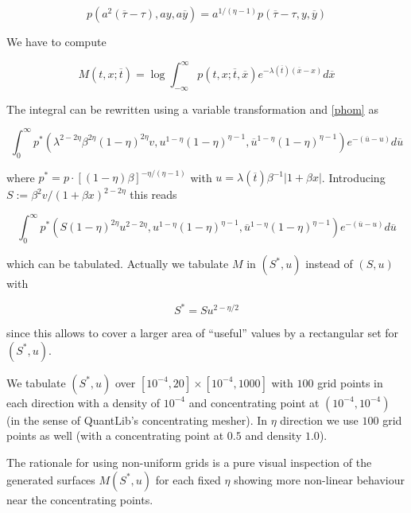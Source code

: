 \documentclass{amsart}
\theoremstyle{plain}
\numberwithin{equation}{section}
\begin{document}
\begin{equation}\label{phom}
p\left(a^2(\overline{\tau}-\tau), ay, a\overline{y}\right) = a^{1/(\eta-1)} p\left(\overline{\tau}-\tau, y, \overline{y}\right)
\end{equation}

We have to compute

\begin{equation}
M(t,x;\overline{t}) = \log \int_{-\infty}^{\infty} p(t,x;\overline{t},\overline{x}) e^{-\lambda(\overline{t})(\overline{x}-x)}d\overline{x}
\end{equation}

The integral can be rewritten using a variable transformation and \ref{phom} as

\begin{equation}
\int_{0}^{\infty} p^* ( \lambda^{2-2\eta} \beta^{2\eta} (1-\eta)^{2\eta} v, u^{1-\eta}(1-\eta)^{\eta-1}, \overline{u}^{1-\eta}(1-\eta)^{\eta-1} ) e^{-(\overline{u}-u)} d\overline{u}
\end{equation}

where $p^*= p\cdot [(1-\eta)\beta]^{-\eta/(\eta-1)}$ with $u = \lambda(\overline{t})\beta^{-1}|1+\beta x|$. Introducing $S:=\beta^2v/(1+\beta x)^{2-2\eta}$ this reads

\begin{equation}
\int_{0}^{\infty} p^* ( S (1-\eta)^{2\eta} u^{2-2\eta}, u^{1-\eta}(1-\eta)^{\eta-1}, \overline{u}^{1-\eta}(1-\eta)^{\eta-1} ) e^{-(\overline{u}-u)} d\overline{u}
\end{equation}

which can be tabulated. Actually we tabulate $M$ in $(S^*,u)$ instead of $(S,u)$ with

\begin{equation}
S^* = S u^{2-\eta/2}
\end{equation}

since this allows to cover a larger area of ``useful'' values by a rectangular set for $(S^*,u)$.

We tabulate $(S^*,u)$ over $[10^{-4},20] \times [10^{-4},1000]$ with $100$ grid points in each direction with a density of $10^{-4}$ and concentrating point at $(10^{-4}, 10^{-4})$ (in the sense of QuantLib's concentrating mesher). In $\eta$ direction we use $100$ grid points as well (with a concentrating point at $0.5$ and density $1.0$). 

The rationale for using non-uniform grids is a pure visual inspection of the generated surfaces $M(S^*,u)$ for each fixed $\eta$ showing more non-linear behaviour near the concentrating points.
\end{document}
